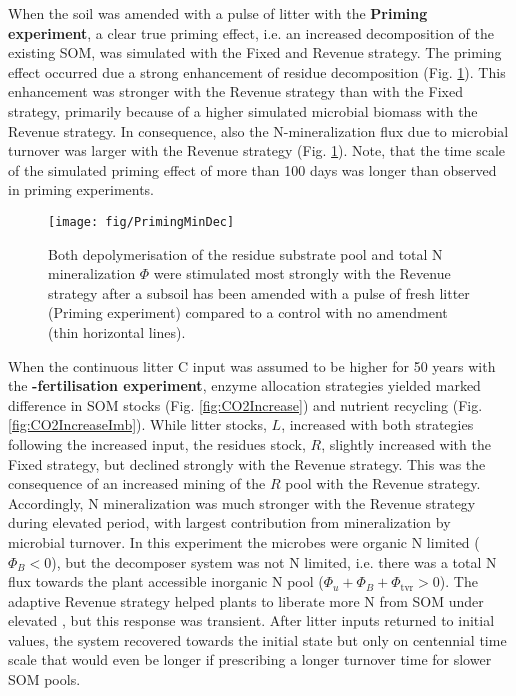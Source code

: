 When the soil was amended with a pulse of litter with the \textbf{Priming
experiment}, a clear true priming effect, i.e. an increased decomposition of the
existing SOM, was simulated with the Fixed and Revenue strategy.
The priming effect occurred due a strong enhancement of residue decomposition
(Fig. \ref{fig:PrimingMinDec}). This
enhancement was stronger with the Revenue strategy than with the Fixed strategy,
primarily because of a higher simulated microbial biomass with the Revenue
strategy. In consequence, also the N-mineralization flux due to microbial
turnover was larger with the Revenue strategy (Fig. \ref{fig:PrimingMinDec}).
Note, that the time scale of the simulated priming effect of more than 100 days
was longer than observed in priming experiments.

\begin{figure}[t] \vspace*{2mm}
\begin{center}
\texttt{[image: fig/PrimingMinDec]}
\end{center}
\caption{
Both depolymerisation of the residue substrate pool and total N
mineralization $\Phi$ were stimulated most strongly with the Revenue strategy
after a subsoil has been amended with a pulse of fresh litter (Priming experiment)
compared to a control with no amendment (thin horizontal lines).
\label{fig:PrimingMinDec}}
\end{figure}

When the continuous litter C input was assumed to be higher for 50 years with
the \textbf{-fertilisation experiment}, enzyme allocation strategies
yielded marked difference in SOM stocks (Fig. \ref{fig:CO2Increase}) and
nutrient recycling (Fig. \ref{fig:CO2IncreaseImb}).
While litter stocks, $L$, increased with both strategies following the increased
input, the residues stock, $R$, slightly increased with the Fixed strategy, but
declined strongly with the Revenue strategy. This was the consequence of an
increased mining of the $R$ pool with the Revenue strategy. Accordingly, N
mineralization was much stronger with the Revenue strategy during elevated
 period, with largest contribution from mineralization by microbial
turnover. In this experiment the microbes were organic N limited ($\Phi_B < 0$),
but the decomposer system was not N limited, i.e. there was a total N flux
towards the plant accessible inorganic N pool ($\Phi_u + \Phi_B +
\Phi_{\operatorname{tvr}} > 0$). The adaptive Revenue strategy helped plants to
liberate more N from SOM under elevated , but this response was
transient. After litter inputs returned to initial values, the system recovered
towards the initial state but only on centennial time scale that would even be
longer if prescribing a longer turnover time for slower SOM pools.

